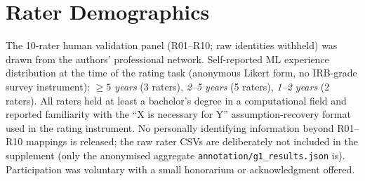 \documentclass[11pt]{article}
\newcommand{\fpath}[1]{\mbox{}\nolinkurl{#1}}
\begin{document}
\section{Rater Demographics}\label{app:raters}

The 10-rater human validation panel (R01--R10; raw identities withheld) was drawn from the authors' professional network. Self-reported ML experience distribution at the time of the rating task (anonymous Likert form, no IRB-grade survey instrument): \emph{${\geq}5$ years} (3 raters), \emph{2--5 years} (5 raters), \emph{1--2 years} (2 raters). All raters held at least a bachelor's degree in a computational field and reported familiarity with the ``X is necessary for Y'' assumption-recovery format used in the rating instrument. No personally identifying information beyond R01--R10 mappings is released; the raw rater CSVs are deliberately not included in the supplement (only the anonymised aggregate \fpath{annotation/g1_results.json} is). Participation was voluntary with a small honorarium or acknowledgment offered.
\end{document}
